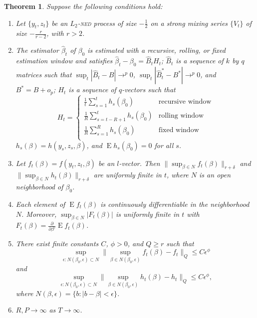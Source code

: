 \documentclass[10pt,fleqn,draft]{article}
\newtheorem{thm}{Theorem}
\theoremstyle{definition}
\DeclareMathOperator{\E}{E}
\newcommand{\dd}[1]{\frac{\partial}{\partial #1}}
\newcommand{\ned}{\textsc{ned}}
\begin{document}
\begin{thm}\label{res:3}
  Suppose the following conditions hold:
  \begin{enumerate}
  \item Let $\{y_t, z_t\}$ be an $L_2$-\textsl{\ned} process of size $-\frac12$ on
    a strong mixing series $\{V_t\}$ of size $-\frac{r}{r-2}$, with $r
    > 2$.
  \item The estimator $\hat{\beta}_t$ of $\beta_0$ is estimated with a
    recursive, rolling, or fixed estimation window and satisfies
    $\hat{\beta}_{t} - \beta_{0} = \hat{B}_{t} H_t$; $\hat{B}_{t}$ is
    a sequence of $k$ by $q$ matrices such that $\sup_t |\hat{B}_t -
    B| \to^p 0$, $\sup_t |\hat{B}_t^{*} - B^{*}| \to^p 0$, and $B^{*}
    = B + o_p$; $H_{t}$ is a sequence of $q$-vectors such that 
    \begin{equation}
      H_{t} = \begin{cases} 
        \tfrac1t \sum_{s=1}^t h_{s}(\beta_{0}) & \text{recursive window} \\
        \tfrac1R \sum_{s=t-R+1}^t h_{s}(\beta_{0}) & \text{rolling window} \\
        \tfrac1R \sum_{s=1}^R h_{s}(\beta_{0}) & \text{fixed window} \\
      \end{cases}
    \end{equation}
    $h_{s}(\beta) = h(y_{s}, z_{s}, \beta)$, and $\E h_{s}(\beta_{0})
    = 0$ for all $s$.
  \item Let $f_{t}(\beta) = f(y_{t}, z_{t}, \beta)$ be an $l$-vector.
    Then $\| \sup_{\beta \in N} f_{t}(\beta) \|_{r+\delta}$ and $\|
    \sup_{\beta \in N} h_{t}(\beta) \|_{r+\delta}$ are uniformly
    finite in $t$, where $N$ is an open neighborhood of $\beta_{0}$.
  \item Each element of $\E f_{t}(\beta)$ is continuously
    differentiable in the neighborhood $N$.  Moreover, $\sup_{\beta
      \in N} | F_{t}(\beta) |$ is uniformly finite in $t$ with
    $F_{t}(\beta) = \dd{\beta'} \E f_{t}(\beta)$.
  \item There exist finite constants $C$, $\phi > 0$, and $Q \geq r$
    such that \[\sup_{\epsilon : N(\beta_{0}, \epsilon) \subset N}\|
    \sup_{\beta \in N(\beta_{0}, \epsilon)} f_{t}(\beta) - f_{t} \|_Q
    \leq C \epsilon^{\phi}\] and \[\sup_{\epsilon : N(\beta_{0},
      \epsilon) \subset N}\| \sup_{\beta \in N(\beta_{0}, \epsilon)}
    h_{t}(\beta) - h_{t} \|_Q \leq C \epsilon^{\phi},\] where
    $N(\beta, \epsilon) = \{b : |b - \beta| < \epsilon\}$.
  \item $R, P \to \infty$ as $T \to \infty$.

\end{enumerate}
\end{thm}
\end{document}
